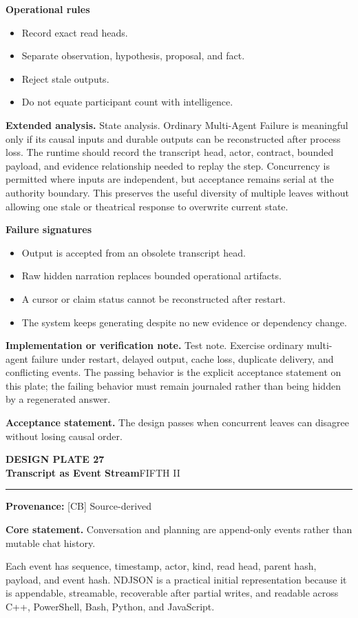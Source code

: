 \documentclass[10pt,letterpaper,oneside]{article}
\newcommand{\prov}[1]{\textcolor{gardenBlue}{\sffamily\footnotesize\textbf{Provenance:} #1}}
\newcommand{\platetitle}[3]{%
  \begin{minipage}[t][0.54in][t]{\textwidth}
  {\sffamily\bfseries\color{gardenDeep}\fontsize{9}{10}\selectfont DESIGN PLATE #1}\\[-1pt]
  {\sffamily\bfseries\color{gardenInk}\fontsize{16.5}{18}\selectfont #2}\hfill{\sffamily\color{gardenGreen}\large #3}
  \end{minipage}\vspace{-2pt}\hrule\vspace{5pt}}
\begin{document}
\textbf{Operational rules}
\begin{itemize}
\item Record exact read heads.
\item Separate observation, hypothesis, proposal, and fact.
\item Reject stale outputs.
\item Do not equate participant count with intelligence.
\end{itemize}
\textbf{Extended analysis.} State analysis. Ordinary Multi-Agent Failure is meaningful only if its causal inputs and durable outputs can be reconstructed after process loss. The runtime should record the transcript head, actor, contract, bounded payload, and evidence relationship needed to replay the step. Concurrency is permitted where inputs are independent, but acceptance remains serial at the authority boundary. This preserves the useful diversity of multiple leaves without allowing one stale or theatrical response to overwrite current state.

\textbf{Failure signatures}
\begin{itemize}
\item Output is accepted from an obsolete transcript head.
\item Raw hidden narration replaces bounded operational artifacts.
\item A cursor or claim status cannot be reconstructed after restart.
\item The system keeps generating despite no new evidence or dependency change.
\end{itemize}
\textbf{Implementation or verification note.} Test note. Exercise ordinary multi-agent failure under restart, delayed output, cache loss, duplicate delivery, and conflicting events. The passing behavior is the explicit acceptance statement on this plate; the failing behavior must remain journaled rather than being hidden by a regenerated answer.

\begin{acceptbox}
\textbf{Acceptance statement.} The design passes when concurrent leaves can disagree without losing causal order.
\end{acceptbox}
\newpage
\platetitle{27}{Transcript as Event Stream}{FIFTH II}
\prov{[CB] Source-derived}
\fontsize{8.85}{10.45}\selectfont
\begin{corebox}
\textbf{Core statement.} Conversation and planning are append-only events rather than mutable chat history.
\end{corebox}
Each event has sequence, timestamp, actor, kind, read head, parent hash, payload, and event hash. NDJSON is a practical initial representation because it is appendable, streamable, recoverable after partial writes, and readable across C++, PowerShell, Bash, Python, and JavaScript.
\end{document}
